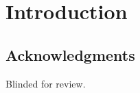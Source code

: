 \section{Introduction}\label{introduction}

\subsection{Acknowledgments}\label{acknowledgments}

Blinded for review. \cite{hammer_tapping_2003}

\cite{hammer_two_1989}

\clearpage



